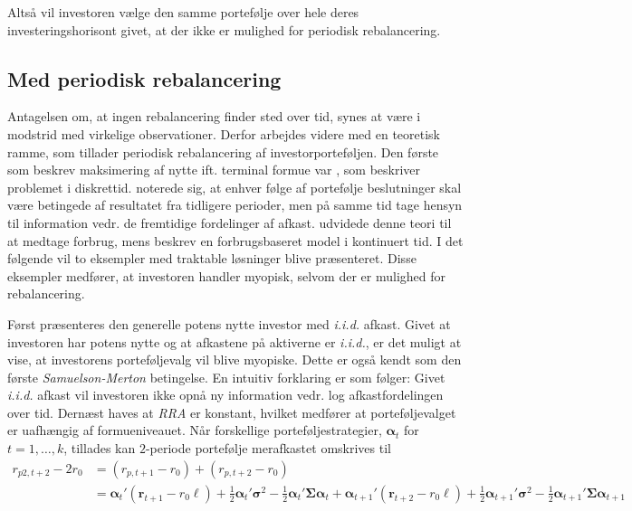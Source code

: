 \documentclass[
  a4paper,
  oneside]{memoir}
\begin{document}
Altså vil investoren vælge den samme portefølje over hele deres investeringshorisont givet, at der ikke er mulighed for periodisk rebalancering.

\hypertarget{medperireb}{%
\subsection{Med periodisk rebalancering}\label{medperireb}}

Antagelsen om, at ingen rebalancering finder sted over tid, synes at være i modstrid med virkelige observationer. Derfor arbejdes videre med en teoretisk ramme, som tillader periodisk rebalancering af investorporteføljen. Den første som beskrev maksimering af nytte ift. terminal formue var \citep{Mossin1968}, som beskriver problemet i diskrettid. \citep{Mossin1968} noterede sig, at enhver følge af portefølje beslutninger skal være betingede af resultatet fra tidligere perioder, men på samme tid tage hensyn til information vedr. de fremtidige fordelinger af afkast. \citep{Samuelson1969} udvidede denne teori til at medtage forbrug, mens \citep{Merton1969, Merton1971} beskrev en forbrugsbaseret model i kontinuert tid. I det følgende vil to eksempler med traktable løsninger blive præsenteret. Disse eksempler medfører, at investoren handler myopisk, selvom der er mulighed for rebalancering.

Først præsenteres den generelle potens nytte investor med \emph{i.i.d.} afkast. Givet at investoren har potens nytte og at afkastene på aktiverne er \emph{i.i.d.}, er det muligt at vise, at investorens porteføljevalg vil blive myopiske. Dette er også kendt som den første \emph{Samuelson-Merton} betingelse. En intuitiv forklaring er som følger: Givet \emph{i.i.d.} afkast vil investoren ikke opnå ny information vedr. log afkastfordelingen over tid. Dernæst haves at \emph{RRA} er konstant, hvilket medfører at porteføljevalget er uafhængig af formueniveauet. Når forskellige porteføljestrategier, \(\bm{\alpha}_t\) for \(t=1,\dots,k\), tillades kan \(2\)-periode portefølje merafkastet omskrives til
\begin{align}
r_{p2,t+2}-2r_0&=(r_{p,t+1}-r_0)+(r_{p,t+2}-r_0)\\
&= \bm{\alpha}_t'(\bm{r}_{t+1}-r_0\bm{\ell})+\frac{1}{2}\bm{\alpha}_t'\bm{\sigma}^2-\frac{1}{2} \bm{\alpha}_t'\bm{\Sigma}\bm{\alpha}_t + \bm{\alpha}_{t+1}'(\bm{r}_{t+2}-r_0\bm{\ell})+\frac{1}{2}\bm{\alpha}_{t+1}'\bm{\sigma}^2-\frac{1}{2} \bm{\alpha}_{t+1}'\bm{\Sigma}\bm{\alpha}_{t+1}
\end{align}
\end{document}
